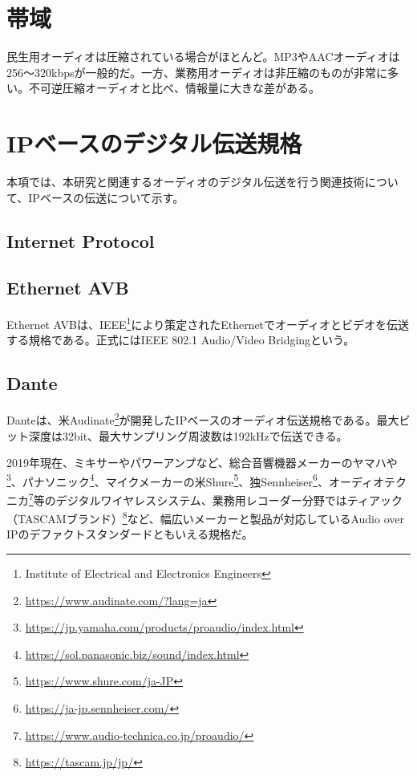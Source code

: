\section{帯域}

民生用オーディオは圧縮されている場合がほとんど。MP3やAACオーディオは256〜320kbpsが一般的だ。一方、業務用オーディオは非圧縮のものが非常に多い。不可逆圧縮オーディオと比べ、情報量に大きな差がある。

\section{IPベースのデジタル伝送規格}

本項では、本研究と関連するオーディオのデジタル伝送を行う関連技術について、IPベースの伝送について示す。

\subsection{Internet Protocol}

\subsection{Ethernet AVB}

Ethernet AVBは、IEEE\footnote{Institute of Electrical and Electronics Engineers}により策定されたEthernetでオーディオとビデオを伝送する規格である。正式にはIEEE 802.1 Audio/Video Bridgingという。

\subsection{Dante}

Danteは、米Audinate\footnote{\url{https://www.audinate.com/?lang=ja}}が開発したIPベースのオーディオ伝送規格である。最大ビット深度は32bit、最大サンプリング周波数は192kHzで伝送できる\cite{best-practices-in-network-audio}。

2019年現在、ミキサーやパワーアンプなど、総合音響機器メーカーのヤマハや\footnote{\url{https://jp.yamaha.com/products/proaudio/index.html}}、パナソニック\footnote{\url{https://sol.panasonic.biz/sound/index.html}}、マイクメーカーの米Shure\footnote{\url{https://www.shure.com/ja-JP}}、独Sennheiser\footnote{\url{https://ja-jp.sennheiser.com/}}、オーディオテクニカ\footnote{\url{https://www.audio-technica.co.jp/proaudio/}}等のデジタルワイヤレスシステム、業務用レコーダー分野ではティアック（TASCAMブランド）\footnote{\url{https://tascam.jp/jp/}}など、幅広いメーカーと製品が対応しているAudio over IPのデファクトスタンダードともいえる規格だ。

